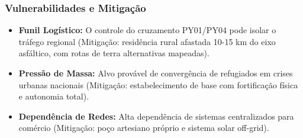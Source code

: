 \subsubsection{Vulnerabilidades e
Mitigação}

\begin{itemize}
\tightlist
\item
  \textbf{Funil Logístico:} O controle do cruzamento PY01/\allowbreak PY04 pode
  isolar o tráfego regional (Mitigação: residência rural afastada 10-15
  km do eixo asfáltico, com rotas de terra alternativas mapeadas).
\item
  \textbf{Pressão de Massa:} Alvo provável de convergência de refugiados
  em crises urbanas nacionais (Mitigação: estabelecimento de base com
  fortificação física e autonomia total).
\item
  \textbf{Dependência de Redes:} Alta dependência de sistemas
  centralizados para comércio (Mitigação: poço artesiano próprio e
  sistema solar off-grid).
\end{itemize}

